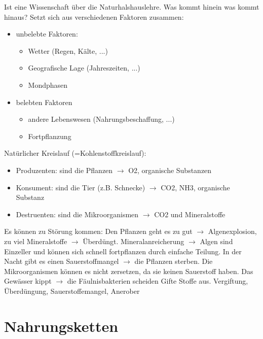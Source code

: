 \documentclass[a4paper]{article}
\begin{document}
Ist eine Wissenschaft über die Naturhalshauslehre. Was kommt hinein was kommt hinaus? Setzt sich aus verschiedenen Faktoren zusammen:

\begin{itemize}
\item unbelebte Faktoren:

	\begin{itemize}
	\item Wetter (Regen, Kälte, ...)
	\item Geografische Lage (Jahreszeiten, ...)
	\item Mondphasen
	\end{itemize}
	
\item belebten Faktoren

	\begin{itemize}
	\item andere Lebenswesen (Nahrungsbeschaffung, ...)
	\item Fortpflanzung
	\end{itemize}
	
\end{itemize}

Natürlicher Kreislauf (=Kohlenstoffkreislauf):

\begin{itemize}
\item Produzenten: sind die Pflanzen $\rightarrow$ O2, organische Substanzen
\item Konsument: sind die Tier (z.B. Schnecke) $\rightarrow$ CO2, NH3, organische Substanz
\item Destruenten: sind die Mikroorganismen $\rightarrow$ CO2 und Mineralstoffe
\end{itemize}

Es können zu Störung kommen: Den Pflanzen geht es zu gut $\rightarrow$ Algenexplosion, zu viel Mineralstoffe $\rightarrow$ Überdüngt. Mineralanreicherung $\rightarrow$ Algen sind Einzeller und können sich schnell fortpflanzen durch einfache Teilung. In der Nacht gibt es einen Sauerstoffmangel $\rightarrow$ die Pflanzen sterben. Die Mikroorganismen können es nicht zersetzen, da sie keinen Sauerstoff haben. Das Gewässer kippt $\rightarrow$ die Fäulnisbakterien scheiden Gifte Stoffe aus. Vergiftung, Überdüngung, Sauerstoffemangel, Anerober

\section{Nahrungsketten}
\end{document}
